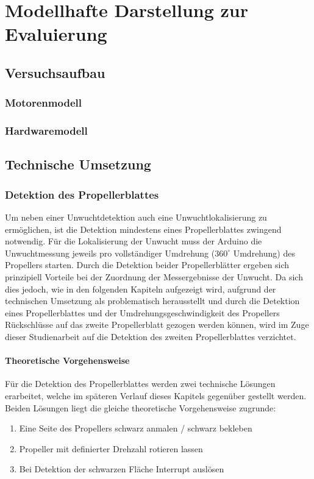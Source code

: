 
\chapter{Modellhafte Darstellung zur Evaluierung}

\section{Versuchsaufbau}

\subsection{Motorenmodell}

\subsection{Hardwaremodell}
\label{subsec:hardwaremodell}

\section{Technische Umsetzung}

\subsection{Detektion des Propellerblattes}
\label{sec:detect_propeller}
Um neben einer Unwuchtdetektion auch eine Unwuchtlokalisierung zu ermöglichen, ist die Detektion mindestens eines Propellerblattes zwingend notwendig.
Für die Lokalisierung der Unwucht muss der Arduino die Unwuchtmessung jeweils pro vollständiger Umdrehung ($360^\circ$ Umdrehung) des Propellers starten.
Durch die Detektion beider Propellerblätter ergeben sich prinzipiell Vorteile bei der Zuordnung der Messergebnisse der Unwucht. 
Da sich dies jedoch, wie in den folgenden Kapiteln aufgezeigt wird, aufgrund der technischen Umsetzung als problematisch herausstellt und durch die Detektion eines Propellerblattes und der Umdrehungsgeschwindigkeit des Propellers Rückschlüsse auf das zweite Propellerblatt gezogen werden können, wird im Zuge dieser Studienarbeit auf die Detektion des zweiten Propellerblattes verzichtet.

\subsubsection*{Theoretische Vorgehensweise}
Für die Detektion des Propellerblattes werden zwei technische Lösungen erarbeitet, welche im späteren Verlauf dieses Kapitels gegenüber gestellt werden.
Beiden Lösungen liegt die gleiche theoretische Vorgehensweise zugrunde:
\begin{enumerate}
	\item Eine Seite des Propellers schwarz anmalen / schwarz bekleben
	\item Propeller mit definierter Drehzahl rotieren lassen
	\item Bei Detektion der schwarzen Fläche Interrupt auslösen
\end{enumerate}


